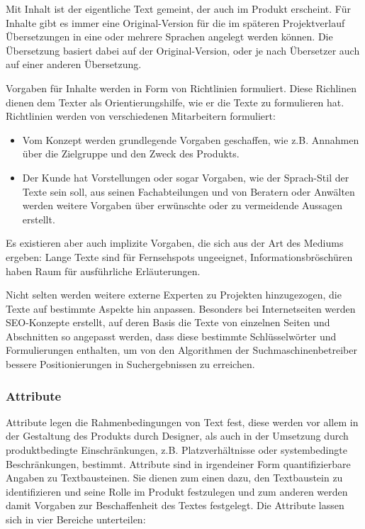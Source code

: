 Mit Inhalt ist der eigentliche Text gemeint, der auch im Produkt erscheint. Für Inhalte gibt es immer eine Original-Version für die im späteren Projektverlauf Übersetzungen in eine oder mehrere Sprachen angelegt werden können. Die Übersetzung basiert dabei auf der Original-Version, oder je nach Übersetzer auch auf einer anderen Übersetzung.

Vorgaben für Inhalte werden in Form von Richtlinien formuliert. Diese Richlinen dienen dem Texter als Orientierungshilfe, wie er die Texte zu formulieren hat. Richtlinien werden von verschiedenen Mitarbeitern formuliert: 
\begin{itemize}\itemsep -5pt
\item Vom Konzept werden grundlegende Vorgaben geschaffen, wie z.B. Annahmen über die Zielgruppe und den Zweck des Produkts.
\item Der Kunde hat Vorstellungen oder sogar Vorgaben, wie der Sprach-Stil der Texte sein soll, aus seinen Fachabteilungen und von Beratern oder Anwälten werden weitere Vorgaben über erwünschte oder zu vermeidende Aussagen erstellt.
\end{itemize}
Es existieren aber auch implizite Vorgaben, die sich aus der Art des Mediums ergeben: Lange Texte sind für Fernsehspots ungeeignet, Informationsbröschüren haben Raum für ausführliche Erläuterungen.

Nicht selten werden weitere externe Experten zu Projekten hinzugezogen, die Texte auf bestimmte Aspekte hin anpassen. Besonders bei Internetseiten werden SEO-Konzepte erstellt, auf deren Basis die Texte von einzelnen Seiten und Abschnitten so angepasst werden, dass diese bestimmte Schlüsselwörter und Formulierungen enthalten, um von den Algorithmen der Suchmaschinenbetreiber bessere Positionierungen in Suchergebnissen zu erreichen.

\subsubsection{Attribute} 

Attribute legen die Rahmenbedingungen von Text fest, diese werden vor allem in der Gestaltung des Produkts durch Designer, als auch in der Umsetzung durch produktbedingte Einschränkungen, z.B. Platzverhältnisse oder systembedingte Beschränkungen, bestimmt. Attribute sind in irgendeiner Form quantifizierbare Angaben zu Textbausteinen. Sie dienen zum einen dazu, den Textbaustein zu identifizieren und seine Rolle im Produkt festzulegen und zum anderen werden damit Vorgaben zur Beschaffenheit des Textes festgelegt. Die Attribute lassen sich in vier Bereiche unterteilen:

